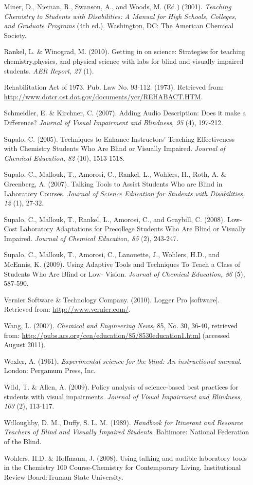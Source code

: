 \documentclass[11.5pt]{sig-alternate} %
\begin{document}
Miner, D., Nieman, R., Swanson, A., and Woods, M. (Ed.) (2001). \textit{Teaching Chemistry to Students with Disabilities: A Manual for High Schools, Colleges, and Graduate Programs} (4th ed.). Washington, DC: The American Chemical Society.

Rankel, L. \& Winograd, M. (2010). Getting in on science: Strategies for teaching chemistry,physics, and physical science with labs for blind and visually impaired students. \textit{AER Report, 27} (1). 

Rehabilitation Act of 1973. Pub. Law No. 93-112. (1973). Retrieved from: \url{http://www.dotcr.ost.dot.gov/documents/ycr/REHABACT.HTM}. 

Schmeidler, E. \& Kirchner, C. (2007). Adding Audio Description: Does it make a Difference? \textit{Journal of Visual Impairment and Blindness, 95} (4), 197-212. 

Supalo, C. (2005). Techniques to Enhance Instructors' Teaching Effectiveness with Chemistry Students Who Are Blind or Visually Impaired. \textit{Journal of Chemical Education, 82} (10), 1513-1518. 

Supalo, C., Mallouk, T., Amorosi, C., Rankel, L., Wohlers, H., Roth, A. \& Greenberg, A. (2007). Talking Tools to Assist Students Who are Blind in Laboratory Courses. \textit{Journal of Science Education for Students with Disabilities, 12} (1), 27-32. 

Supalo, C., Mallouk, T., Rankel, L., Amorosi, C., and Graybill, C. (2008). Low-Cost Laboratory Adaptations for Precollege Students Who Are Blind or Visually Impaired. \textit{Journal of Chemical Education, 85} (2), 243-247. 

Supalo, C., Mallouk, T., Amorosi, C., Lanouette, J., Wohlers, H.D., and McEnnis, K. (2009). Using Adaptive Tools and Techniques To Teach a Class of Students Who Are Blind or Low- Vision. \textit{Journal of Chemical Education, 86} (5), 587-590. 

Vernier Software \& Technology Company. (2010). Logger Pro [software]. Retrieved from: \url{http://www.vernier.com/}. 

Wang, L. (2007). \textit{Chemical and Engineering News}, 85, No. 30, 36-40, retrieved from: \url{http://pubs.acs.org/cen/education/85/8530education1.html} (accessed August 2011).

Wexler, A. (1961). \textit{Experimental science for the blind: An instructional manual}. London: Pergamum Press, Inc. 

Wild, T. \& Allen, A. (2009). Policy analysis of science-based best practices for students with visual impairments. \textit{Journal of Visual Impairment and Blindness, 103} (2), 113-117. 

Willoughby, D. M., Duffy, S. L. M. (1989). \textit{Handbook for Itinerant and Resource Teachers of Blind and Visually Impaired Students}. Baltimore: National Federation of the Blind. 

Wohlers, H.D. \& Hoffmann, J. (2008). Using talking and audible laboratory tools in the Chemistry 100 Course-Chemistry for Contemporary Living. Institutional Review Board:Truman State University.
\end{document}
